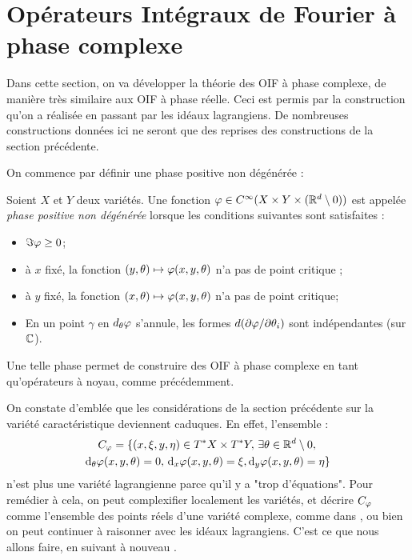 \section{Opérateurs Intégraux de Fourier à phase complexe}
Dans cette section, on va développer la théorie des OIF à phase complexe, de manière très similaire aux OIF à phase réelle. Ceci est permis par la construction qu'on a réalisée en passant par les idéaux lagrangiens. De nombreuses constructions données ici ne seront que des reprises des constructions de la section précédente.

On commence par définir une phase positive non dégénérée :
\begin{defn}
	Soient $X$ et $Y$ deux variétés. Une fonction $\varphi \in C^{\infty}(X\times Y \times (\mathbb{R}^d\setminus 0))$ est appelée \emph{phase positive non dégénérée} lorsque les conditions suivantes sont satisfaites :
	\begin{itemize}
		\item $\Im \varphi \geq 0$;
		\item à $x$ fixé, la fonction $(y,\theta) \mapsto \varphi(x,y,\theta)$ n'a pas de point critique ;
		\item à $y$ fixé, la fonction $(x,\theta) \mapsto \varphi(x,y,\theta)$ n'a pas de point critique; 
		\item En un point $\gamma$ en $d_{\theta}\varphi$ s'annule, les formes $d(\partial \varphi/\partial \theta_i)$ sont indépendantes (sur $\mathbb{C}$).
	\end{itemize}
\end{defn}

Une telle phase permet de construire des OIF à phase complexe en tant qu'opérateurs à noyau, comme précédemment.

On constate d'emblée que les considérations de la section précédente sur la variété caractéristique deviennent caduques. En effet, l'ensemble :
\begin{multline*}
C_{\varphi}=\{(x,\xi,y,\eta) \in T^*X \times T^*Y,\,\exists \theta\in \mathbb{R}^d\setminus 0,\,\\\mathrm{d}_{\theta}\varphi(x,y,\theta)=0,\,\mathrm{d}_x\varphi(x,y,\theta)=\xi, \mathrm{d}_y\varphi(x,y,\theta)=\eta\}
\end{multline*}
n'est plus une variété lagrangienne parce qu'il y a "trop d'équations". Pour remédier à cela, on peut complexifier localement les variétés, et décrire $C_{\varphi}$ comme l'ensemble des points réels d'une variété complexe, comme dans \cite{melin1975fourier}, ou bien on peut continuer à raisonner avec les idéaux lagrangiens. C'est ce que nous allons faire, en suivant à nouveau \cite{hormander1985}.

